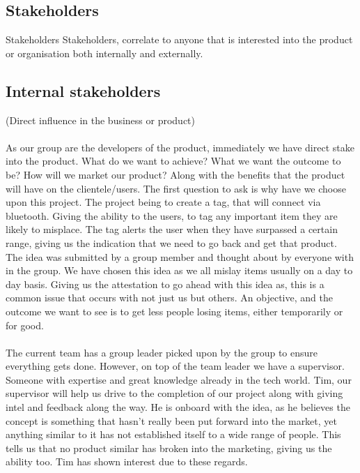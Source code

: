 \documentclass[12pt,a4paper]{article}
\begin{document}
\begin{appendices}
      \section{Stakeholders}
        \label{appendix:stakeholders}
        Stakeholders Stakeholders, correlate to anyone that is interested into the product or organisation both internally and externally.
        \subsection{Internal stakeholders}
          (Direct influence in the business or product)
        \paragraph{}
          As our group are the developers of the product, immediately we have direct stake into the product. What do we want to achieve? What we want the outcome to be? How will we market our product? Along with the benefits that the product will have on the clientele/users. The first question to ask is why have we choose upon this project. The project being to create a tag, that will connect via bluetooth. Giving the ability to the users, to tag any important item they are likely to misplace. The tag alerts the user when they have surpassed a certain range, giving us the indication that we need to go back and get that product. The idea was submitted by a group member and thought about by everyone with in the group. We have chosen this idea as we all mislay items usually on a day to day basis. Giving us the attestation to go ahead with this idea as, this is a common issue that occurs with not just us but others. An objective, and the outcome we want to see is to get less people losing items, either temporarily or for good.
        \paragraph{}
          The current team has a group leader picked upon by the group to ensure everything gets done. However, on top of the team leader we have a supervisor. Someone with expertise and great knowledge already in the tech world. Tim, our supervisor will help us drive to the completion of our project along with giving intel and feedback along the way. He is onboard with the idea, as he believes the concept is something that hasn't really been put forward into the market, yet anything similar to it has not established itself to a wide range of people. This tells us that no product similar has broken into the marketing, giving us the ability too. Tim has shown interest due to these regards.

\end{appendices}
\end{document}
